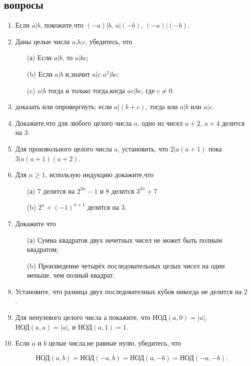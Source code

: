 \documentclass[11pt]{article}
\begin{document}
\subsection{вопросы}
\begin{enumerate}
\item Если $a|b$, покожите,что $(-a)|b$, $a|(-b)$, $(-a)|(-b)$.
\item Даны целые числа $a$,$b$,$c$, убедитесь, что
\begin{enumerate}
    \item[(а)] Если $a|b$, то $a|bc$;
	\item[(b)] Если  $a|b$ и,значит $a|c$ $a^{2}|bc$;
	\item[(c)] $a|b$ тогда и только тогда,когда $ac|bc$, где $c \neq 0$.
\end{enumerate}

\item доказать или опровергнуть: если $a|(b+c)$, тогда или $a|b$ или $a|c$.
\item Докажите,что для любого целого числа $a$, одно из чисел $a + 2$, $a + 4$ делится на $3$.
\item Для произвольного целого числа $a$, установить, что $2|a(a+1)$ пока $3|a(a+1)(a+2)$.
\item Для $n\ge 1$, использую индукцию докажите,что
\begin{enumerate}
	\item[(а)] $7$ делится на $2^{3n}-1$ и $8$ делится $3^{2n}+7$
	\item[(b)] $2^{n}+(-1)^{n+1}$ делится на $3$.
\end{enumerate}
\item Докажите что
\begin{enumerate}
	\item[(а)] Сумма квадратов двух нечетных чисел не может быть полным квадратом;
	\item[(b)] Произведение четырёх последовательных целых чисел на один меньше, чем полный квадрат.
\end{enumerate}
\item Установите, что разница двух последователных кубов никогда не делится на $2$.
\item Для ненулевого целого числа а покажите, что $\text{НОД}(a,0)=|a|$, $\text{НОД}(a,a)=|a|$, и $\text{НОД}(a,1)=1$.
\item  Если $a$ и $b$ целые числа,не равные нулю, убедитесь, что

	\[\text{НОД}(a,b)=\text{НОД}(-a,b)=\text{НОД}(a,-b)=\text{НОД}(-a,-b).\]



\end{enumerate}
\end{document}
